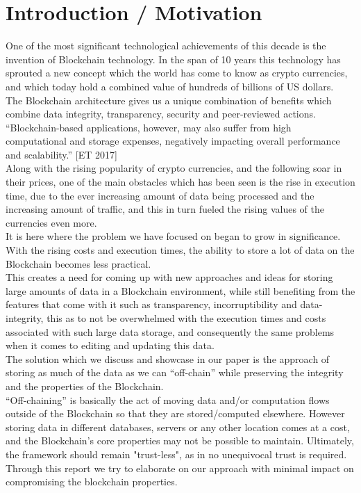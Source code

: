 \section{Introduction / Motivation}

One of the most significant technological achievements of this decade is the invention of Blockchain technology. In the span of 10 years this technology has sprouted a new concept which the world has come to know as crypto currencies, and which today hold a combined value of hundreds of billions of US dollars. \\

The Blockchain architecture gives us a unique combination of benefits which combine data integrity, transparency, security and peer-reviewed actions. 
“Blockchain-based applications, however, may also suffer from high computational and storage expenses, negatively impacting overall performance and scalability.” [ET 2017]\\

Along with the rising popularity of crypto currencies, and the following soar in their prices, one of the main obstacles which has been seen is the rise in execution time, due to the ever increasing amount of data being processed and the increasing amount of traffic, and this in turn fueled the rising values of the currencies even more.  \\

It is here where the problem we have focused on began to grow in significance. With the rising costs and execution times, the ability to store a lot of data on the Blockchain becomes less practical. \\

This creates a need for coming up with new approaches and ideas for storing large amounts of data in a Blockchain environment, while still benefiting from the features that come with it such as transparency, incorruptibility and data-integrity, this as to not be overwhelmed with the execution times and costs associated with such large data storage, and consequently the same problems when it comes to editing and updating this data.  \\


The solution which we discuss and showcase in our paper is the approach of storing as much of the data as we can “off-chain” while preserving the integrity and the properties of the Blockchain.\\

“Off-chaining” is basically the act of moving data and/or computation flows outside of the Blockchain so that they are stored/computed elsewhere. However storing data in different databases, servers or any other location comes at a cost, and the Blockchain’s core properties may not be possible to maintain. Ultimately, the framework should remain "trust-less", as in no unequivocal trust is required. Through this report we try to elaborate on our approach with minimal impact on compromising the blockchain properties.\\

